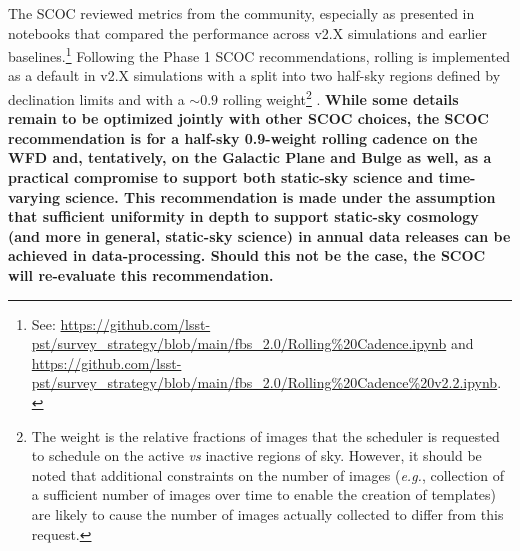  The SCOC reviewed metrics from the community, especially as presented in notebooks that compared the performance across v2.X simulations and earlier baselines.\footnote{See: \url{https://github.com/lsst-pst/survey_strategy/blob/main/fbs_2.0/Rolling\%20Cadence.ipynb} and \url{https://github.com/lsst-pst/survey_strategy/blob/main/fbs_2.0/Rolling\%20Cadence\%20v2.2.ipynb}.} Following the Phase 1 SCOC recommendations, rolling is implemented as a default in v2.X simulations with a split into two half-sky regions defined by declination limits and with a $\sim0.9$ rolling weight\footnote{The weight is the relative fractions of images that the scheduler is requested to schedule on the active \emph{vs} inactive regions of sky. However, it should be noted that additional constraints on the number of images (\emph{e.g.}, collection of a sufficient number of images over time to enable the creation of templates) are likely to cause the number of images actually collected to differ from this request.} . {\bf While some details remain to be optimized jointly with other SCOC choices, the SCOC recommendation is for a half-sky 0.9-weight rolling cadence on the WFD and, tentatively, on the Galactic Plane and Bulge as well, as a practical compromise to support both static-sky science and time-varying science.    
This recommendation is made under the assumption that sufficient uniformity in depth to support static-sky cosmology (and more in general, static-sky science) in annual data releases can be achieved in data-processing.  Should this not be the case, the SCOC will re-evaluate this recommendation.}


